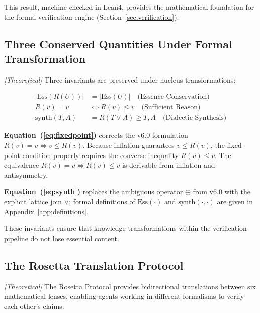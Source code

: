 \documentclass[11pt,a4paper]{article}
\theoremstyle{plain}
\theoremstyle{definition}
\theoremstyle{remark}
\newcommand{\abs}[1]{\left|#1\right|}
\begin{document}
This result, machine-checked in Lean4, provides the mathematical foundation for the formal
verification engine (Section~\ref{sec:verification}).

\subsection{Three Conserved Quantities Under Formal Transformation}

\emph{[Theoretical]} Three invariants are preserved under nucleus transformations:

\begin{align}
  \abs{\mathrm{Ess}(R(U))} &= \abs{\mathrm{Ess}(U)}
    \quad \text{(Essence Conservation)} \label{eq:essence}\\
  R(v) = v &\iff R(v) \leq v
    \quad \text{(Sufficient Reason)} \label{eq:fixedpoint}\\
  \mathrm{synth}(T, A) &= R(T \vee A) \geq T, A
    \quad \text{(Dialectic Synthesis)} \label{eq:synth}
\end{align}

\begin{correction}
\textbf{Equation~(\ref{eq:fixedpoint})} corrects the v6.0 formulation
$R(v) = v \Leftrightarrow v \leq R(v)$.  Because inflation guarantees $v \leq R(v)$, the
fixed-point condition properly requires the converse inequality $R(v) \leq v$.  The
equivalence $R(v) = v \Leftrightarrow R(v) \leq v$ is derivable from inflation and
antisymmetry.

\textbf{Equation~(\ref{eq:synth})} replaces the ambiguous operator $\oplus$ from v6.0 with the
explicit lattice join $\vee$; formal definitions of $\mathrm{Ess}(\cdot)$ and
$\mathrm{synth}(\cdot,\cdot)$ are given in Appendix~\ref{app:definitions}.
\end{correction}

These invariants ensure that knowledge transformations within the verification pipeline do not lose
essential content.

\subsection{The Rosetta Translation Protocol}

\emph{[Theoretical]} The Rosetta Protocol provides bidirectional translations between six
mathematical lenses, enabling agents working in different formalisms to verify each other's claims:
\end{document}
